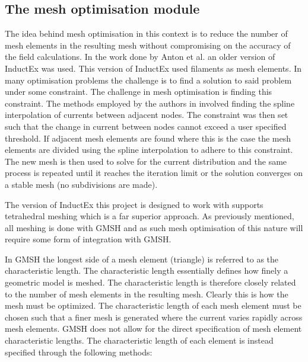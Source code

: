 \subsection{The mesh optimisation module}
The idea behind mesh optimisation in this context is to reduce the number of mesh elements in the resulting mesh without compromising on the accuracy of the field calculations. In the work done by Anton et al. \cite{fluxNoiseSquidsStevenAnton} an older version of InductEx was used. This version of InductEx used filaments as mesh elements. In many optimisation problems the challenge is to find a solution to said problem under some constraint. The challenge in mesh optimisation is finding this constraint. The methods employed by the authors in \cite{fluxNoiseSquidsStevenAnton} involved finding the spline interpolation of currents between adjacent nodes. The constraint was then set such that the change in current between nodes cannot exceed a user specified threshold. If adjacent mesh elements are found where this is the case the mesh elements are divided using the spline interpolation to adhere to this constraint. The new mesh is then used to solve for the current distribution and the same process is repeated until it reaches the iteration limit or the solution converges on a stable mesh (no subdivisions are made). \par
The version of InductEx this project is designed to work with supports tetrahedral meshing which is a far superior approach. As previously mentioned, all meshing is done with GMSH and as such mesh optimisation of this nature will require some form of integration with GMSH. \par
In GMSH the longest side of a mesh element (triangle) is referred to as the characteristic length. The characteristic length essentially defines how finely a geometric model is meshed. The characteristic length is therefore closely related to the number of mesh elements in the resulting mesh. Clearly this is how the mesh must be optimized. The characteristic length of each mesh element must be chosen such that a finer mesh is generated where the current varies rapidly across mesh elements. GMSH does not allow for the direct specification of mesh element characteristic lengths. The characteristic length of each element is instead specified through the following methods: 

